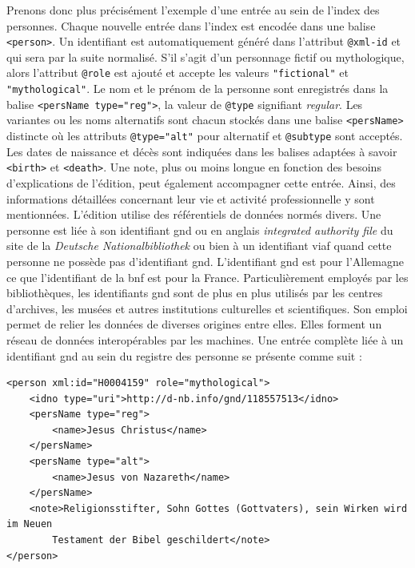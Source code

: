 \documentclass[a4paper, 12pt, twoside]{book}
\begin{document}
Prenons donc plus précisément l'exemple d'une entrée au sein de l'index des personnes. Chaque nouvelle entrée dans l'index est encodée dans une balise \texttt{<person>}. Un identifiant est automatiquement généré dans l'attribut \texttt{@xml-id} et qui sera par la suite normalisé. S'il s'agit d'un personnage fictif ou mythologique, alors l'attribut \texttt{@role} est ajouté et accepte les valeurs \texttt{"fictional"} et \texttt{"mythological"}. Le nom et le prénom de la personne sont enregistrés dans la balise \texttt{<persName type="reg">}, la valeur de \texttt{@type} signifiant \textit{regular}. Les variantes ou les noms alternatifs sont chacun stockés dans une balise \texttt{<persName>} distincte où les attributs \texttt{@type="alt"} pour alternatif et \texttt{@subtype} sont acceptés. Les dates de naissance et décès sont indiquées dans les balises adaptées à savoir \texttt{<birth>} et \texttt{<death>}. Une note, plus ou moins longue en fonction des besoins d'explications de l'édition, peut également accompagner cette entrée. Ainsi, des informations détaillées concernant leur vie et activité professionnelle y sont mentionnées. L'édition utilise des référentiels de données normés divers. Une personne est liée à son identifiant \gls{gnd} ou en anglais \textit{integrated authority file} du site de la \textit{Deutsche Nationalbibliothek} ou bien à un identifiant \gls{viaf} quand cette personne ne possède pas d'identifiant \gls{gnd}. L'identifiant \gls{gnd} est pour l'Allemagne ce que l'identifiant de la \gls{bnf} est pour la France. Particulièrement employés par les bibliothèques, les identifiants \gls{gnd} sont de plus en plus utilisés par les centres d'archives, les musées et autres institutions culturelles et scientifiques. Son emploi permet de relier les données de diverses origines entre elles. Elles forment un réseau de données interopérables par les machines.
Une entrée complète liée à un identifiant \gls{gnd}  au sein du registre des personne se présente comme suit : 

\newpage
\begin{verbatim}
<person xml:id="H0004159" role="mythological">
    <idno type="uri">http://d-nb.info/gnd/118557513</idno>
    <persName type="reg">
        <name>Jesus Christus</name>
    </persName>
    <persName type="alt">
        <name>Jesus von Nazareth</name>
    </persName>
    <note>Religionsstifter, Sohn Gottes (Gottvaters), sein Wirken wird im Neuen
        Testament der Bibel geschildert</note>
</person>
\end{verbatim}
\end{document}
